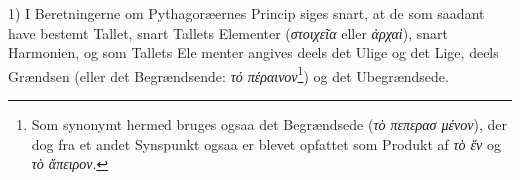 \documentclass[12pt,a4paper]{book}
\newcommand{\gk}[1]{\textit{#1}}
\begin{document}
1) I Beretningerne om Pythagoræernes Princip siges snart,
at de som saadant have bestemt Tallet, snart Tallets Elementer
(\gk{στοιχεῖα} eller \gk{ἀρχαὶ}), snart Harmonien, og som Tallets Ele\-%
menter angives deels det Ulige og det Lige, deels Grændsen
(eller det Begrændsende: \gk{τό πέραινον}\footnote{Som synonymt hermed bruges ogsaa det Begrændsede (\gk{τὸ πεπερασ\-%
μένον}), der dog fra et andet Synspunkt ogsaa er blevet opfattet som Produkt af \gk{τὸ ἕν} og \gk{τὸ ἄπειρον}.}) og det Ubegrændsede.
\end{document}
